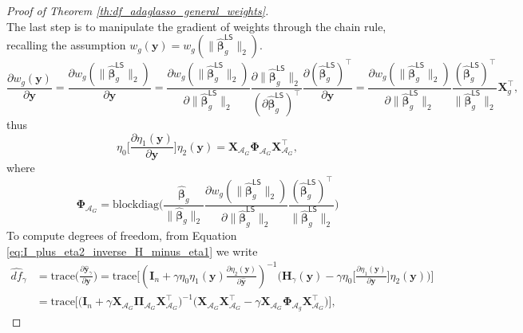 \documentclass[a4paper, 12pt]{article}
\newcommand{\Aset}{\mathcal{A}}
\newcommand{\trace}{\mathrm{trace}}
\newcommand{\T}{\top}
\def\bbeta{\boldsymbol{\beta}}
\def\bPi{\boldsymbol{\Pi}}
\def\bPhi{\boldsymbol{\Phi}}
\def\by{\boldsymbol{y}}
\def\bH{\mathbf{H}}
\def\bI{\mathbf{I}}
\def\bX{\mathbf{X}}
\def\by{\mathbf{y}}
\begin{document}
\begin{appendix}
\begin{proof}[Proof of Theorem \ref{th:df_adaglasso_general_weights}]
\begin{equation*}
\end{equation*}
The last step is to manipulate the gradient of weights through the chain rule, recalling the assumption $w_g(\by)=w_g(\lVert \widehat{\bbeta}_g^\mathsf{LS} \rVert_2)$.
\begin{equation*}
\frac{\partial w_g(\by)}{\partial \by} =  \frac{\partial w_g(\lVert \widehat{\bbeta}_g^\mathsf{LS} \rVert_2)}{\partial \by} = \frac{\partial w_g(\lVert \widehat{\bbeta}_g^\mathsf{LS} \rVert_2)}{\partial \lVert \widehat{\bbeta}_g^\mathsf{LS} \rVert_2} \frac{\partial  \lVert \widehat{\bbeta}_g^\mathsf{LS} \rVert_2}{(\partial \widehat{\bbeta}_g^\mathsf{LS})^{\T}}\frac{\partial  (\widehat{\bbeta}_g^\mathsf{LS})^{\T}}{\partial \by} = \frac{\partial w_g(\lVert \widehat{\bbeta}_g^\mathsf{LS} \rVert_2)}{\partial \lVert \widehat{\bbeta}_g^\mathsf{LS} \rVert_2} \frac{(\widehat{\bbeta}_g^\mathsf{LS})^{\T}}{\lVert\widehat{\bbeta}_g^\mathsf{LS}\rVert_2}\bX_g^{\T},
\end{equation*}
thus 
\begin{equation*}
\eta_0  \bigg[ \frac{\partial \eta_1(\by)}{\partial \by} \bigg] \eta_2(\by) = \bX_{\Aset_G} \bPhi_{\Aset_G} \bX_{\Aset_G}^{\T},
\end{equation*}
where 
\begin{equation*}
    \bPhi_{\Aset_G} = \text{blockdiag}\bigg( \frac{\widehat{\bbeta}_g}{\lVert \widehat{\bbeta}_g \rVert_2}\frac{\partial w_g(\lVert \widehat{\bbeta}_g^\mathsf{LS} \rVert_2)}{\partial \lVert \widehat{\bbeta}_g^\mathsf{LS} \rVert_2} \frac{(\widehat{\bbeta}_g^\mathsf{LS})^{\T}}{\lVert\widehat{\bbeta}_g^\mathsf{LS}\rVert_2}  \bigg)
\end{equation*}
To compute degrees of freedom, from Equation \eqref{eq:I_plus_eta2_inverse_H_minus_eta1} we write
\begin{equation*}
\begin{aligned}
\widehat{df}_\gamma &= \trace \bigg(\frac{\partial \widehat{\by}_\gamma}{\partial\by} \bigg) = \trace \bigg[\left(\bI_n+\gamma \eta_0 \eta_1(\by) \frac{\partial\eta_2(\by)}{\partial \widehat{\by}}\right)^{-1} \bigg(\bH_\gamma(\by) - \gamma \eta_0 \bigg[ \frac{\partial \eta_1(\by)}{\partial \by} \bigg] \eta_2(\by) \bigg) \bigg]\\
&= \trace \bigg[ \bigg( \bI_n + \gamma \bX_{\Aset_G} \bPi_{\Aset_G} \bX_{\Aset_G}^{\T} \bigg)^{-1} \bigg( \bX_{\Aset_G} \bX_{\Aset_G}^{\T} - \gamma \bX_{\Aset_G} \bPhi_{\Aset_g} \bX_{\Aset_G}^{\T}\bigg) \bigg],
\end{aligned}
\end{equation*}

\end{proof}
\end{appendix}
\end{document}
